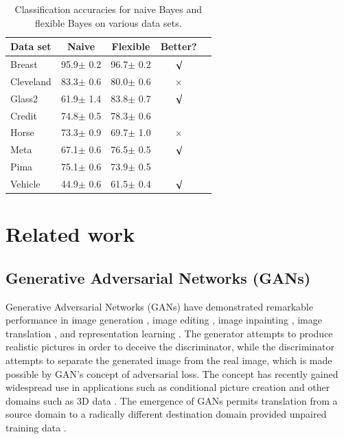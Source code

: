 \documentclass{article}
\begin{document}
\begin{table}[tb]
\vskip 3mm
\begin{center}
\begin{small}
\begin{sc}
\begin{tabular}{lcccr}
\hline
\abovespace\belowspace
Data set & Naive & Flexible & Better? \\
\hline
\abovespace
Breast    & 95.9$\pm$ 0.2& 96.7$\pm$ 0.2& $\surd$ \\
Cleveland & 83.3$\pm$ 0.6& 80.0$\pm$ 0.6& $\times$\\
Glass2    & 61.9$\pm$ 1.4& 83.8$\pm$ 0.7& $\surd$ \\
Credit    & 74.8$\pm$ 0.5& 78.3$\pm$ 0.6&         \\
Horse     & 73.3$\pm$ 0.9& 69.7$\pm$ 1.0& $\times$\\
Meta      & 67.1$\pm$ 0.6& 76.5$\pm$ 0.5& $\surd$ \\
Pima      & 75.1$\pm$ 0.6& 73.9$\pm$ 0.5&         \\
\belowspace
Vehicle   & 44.9$\pm$ 0.6& 61.5$\pm$ 0.4& $\surd$ \\
\hline
\end{tabular}
\end{sc}
\end{small}
\caption{Classification accuracies for naive Bayes and flexible 
Bayes on various data sets.}
\label{tab:sample-table}
\end{center}
\vskip -3mm
\end{table}

\fi


\section{Related work}
\label{sec:relwork}
\subsection{Generative Adversarial Networks (GANs)}
Generative Adversarial Networks (GANs) \cite{GAN} have demonstrated remarkable performance in image generation \cite{image_generation_1}\cite{image_generation_2}\cite{image_generation_3}, image editing \cite{image_editing}, image inpainting \cite{image_inpainting}, image translation \cite{image_translation_1}\cite{image_translation_2}, and representation learning \cite{representation_learning}. The generator attempts to produce realistic pictures in order to deceive the discriminator, while the discriminator attempts to separate the generated image from the real image, which is made possible by GAN's concept of adversarial loss. The concept has recently gained widespread use in applications such as conditional picture creation \cite{text2image} and other domains such as 3D data \cite{3D}. The emergence of GANs permits translation from a source domain to a radically different destination domain provided unpaired training data \cite{Conditional_GANs}.
\end{document}
